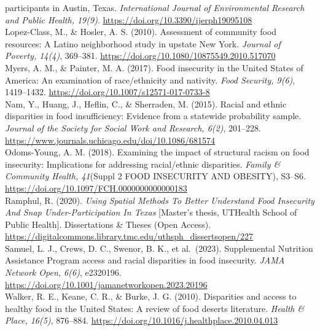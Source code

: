 \documentclass[]{article}
\begin{document}
participants in Austin, Texas. \emph{International Journal of
Environmental Research and Public Health, 19(9)}.
\url{https://doi.org/10.3390/ijerph19095108}\\
Lopez-Class, M., \& Hosler, A. S. (2010). Assessment of community food
resources: A Latino neighborhood study in upstate New York.
\emph{Journal of Poverty, 14(4)}, 369--381.
\url{https://doi.org/10.1080/10875549.2010.517070}\\
Myers, A. M., \& Painter, M. A. (2017). Food insecurity in the United
States of America: An examination of race/ethnicity and nativity.
\emph{Food Security, 9(6)}, 1419--1432.
\url{https://doi.org/10.1007/s12571-017-0733-8}\\
Nam, Y., Huang, J., Heflin, C., \& Sherraden, M. (2015). Racial and
ethnic disparities in food insufficiency: Evidence from a statewide
probability sample. \emph{Journal of the Society for Social Work and
Research, 6(2)}, 201--228.
\url{https://www.journals.uchicago.edu/doi/10.1086/681574}\\
Odoms-Young, A. M. (2018). Examining the impact of structural racism on
food insecurity: Implications for addressing racial/ethnic disparities.
\emph{Family \& Community Health, 41}(Suppl 2 FOOD INSECURITY AND
OBESITY), S3--S6. \url{https://doi.org/10.1097/FCH.0000000000000183}\\
Ramphul, R. (2020). \emph{Using Spatial Methods To Better Understand
Food Insecurity And Snap Under-Participation In Texas} {[}Master's
thesis, UTHealth School of Public Health{]}. Dissertations \& Theses
(Open Access).
\url{https://digitalcommons.library.tmc.edu/uthsph_dissertsopen/227}\\
Samuel, L. J., Crews, D. C., Swenor, B. K., et al.~(2023). Supplemental
Nutrition Assistance Program access and racial disparities in food
insecurity. \emph{JAMA Network Open, 6(6)}, e2320196.
\url{https://doi.org/10.1001/jamanetworkopen.2023.20196}\\
Walker, R. E., Keane, C. R., \& Burke, J. G. (2010). Disparities and
access to healthy food in the United States: A review of food deserts
literature. \emph{Health \& Place, 16(5)}, 876--884.
\url{https://doi.org/10.1016/j.healthplace.2010.04.013}





\newpage
\singlespacing 
\end{document}
